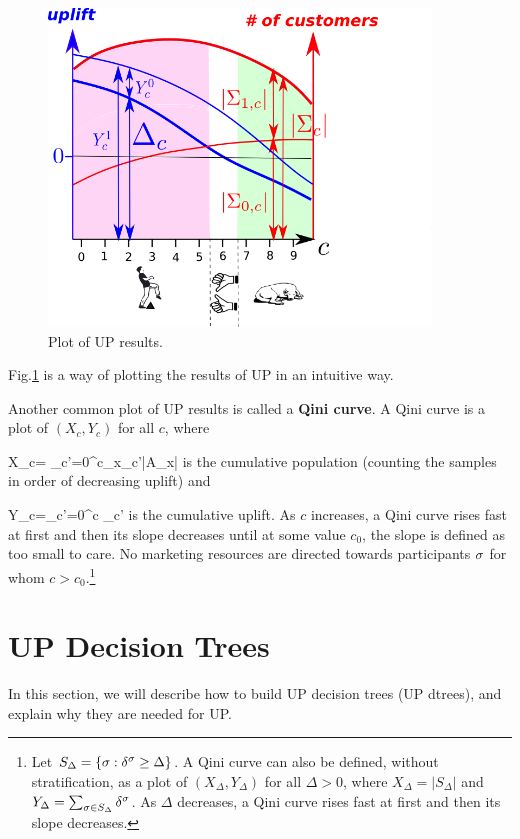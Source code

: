 \begin{figure}[h!]
\centering
\includegraphics[width=4in]
{uplift/qini-fake.png}

\caption{
Plot
of UP results.
} 
\label{fig-qini-fake}
\end{figure}
Fig.\ref{fig-qini-fake}
is a  way of
plotting
the results 
of UP in an
intuitive
way.


Another common plot of UP results is
called a {\bf Qini
curve}.
A Qini curve is a plot 
of $(X_c,Y_c)$
for all $c$, where

\beq
X_c= \sum_{c'=0}^{c}\sum_{x\in \calx_{c'}}|A_x|
\eeq
is the cumulative population (counting the
samples in
order of decreasing uplift) and

\beq
Y_c=\sum_{c'=0}^c \Delta_{c'}
\eeq
is the cumulative uplift.
As $c$ increases, a Qini curve rises fast at first and then its slope decreases until
at some value $c_0$, the slope is defined as too small to care. No marketing resources are
directed towards
participants $\sigma$ for whom  $c>c_0$.\footnote{
Let 
$S_{\Delta} = \{\sigma:\delta^\sigma \geq \Delta\}$.
A Qini curve can also be defined, without stratification,
as a
 plot of $(X_\Delta, Y_\Delta)$ for all $\Delta>0$,
where $
X_\Delta = |S_{\Delta}|$
and
$
Y_\Delta= \sum_{\sigma\in S_{\Delta}}\delta^\sigma
$. As $\Delta$ decreases, a Qini curve rises fast at first and then its slope decreases.
}




\section{UP Decision Trees}

In this section,
we will describe
how to build UP decision trees (UP dtrees),
and explain why they are needed
for UP.

